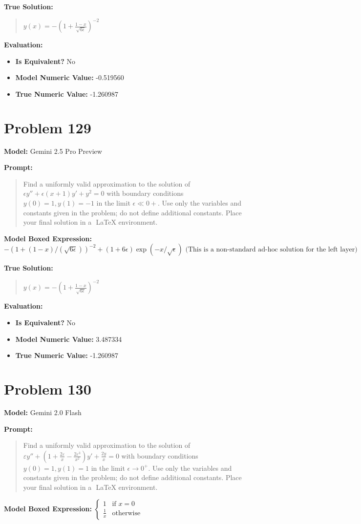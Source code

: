 \documentclass{article}
\begin{document}
{\textbf{True Solution:}
\begin{quote}
$y(x) = -\left(1 + \frac{1-x}{\sqrt{6\epsilon}}\right)^{-2}$
\end{quote}

\textbf{Evaluation:}
\begin{itemize}
\item \textbf{Is Equivalent?} No
\item \textbf{Model Numeric Value:} -0.519560
\item \textbf{True Numeric Value:} -1.260987
\end{itemize}
\vspace{1cm}
\section*{Problem 129}
\textbf{Model:} Gemini 2.5 Pro Preview

\textbf{Prompt:}
\begin{quote}
Find a uniformly valid approximation to the solution of $\epsilon y'' + \epsilon (x+1) y' + y^2 = 0$ with boundary conditions $y(0) = 1, y(1) = -1$ in the limit $\epsilon \ll 0+$. Use only the variables and constants given in the problem; do not define additional constants. Place your final solution in a $\boxed{}$ LaTeX environment.
\end{quote}
\textbf{Model Boxed Expression:} $-(1+(1-x)/(\sqrt{6\epsilon}))^{-2} + (1+6\epsilon)\exp(-x/\sqrt{\epsilon}) \text{ (This is a non-standard ad-hoc solution for the left layer)}$

\textbf{True Solution:}
\begin{quote}
$y(x) = -\left(1 + \frac{1-x}{\sqrt{6\epsilon}}\right)^{-2}$
\end{quote}

\textbf{Evaluation:}
\begin{itemize}
\item \textbf{Is Equivalent?} No
\item \textbf{Model Numeric Value:} 3.487334
\item \textbf{True Numeric Value:} -1.260987
\end{itemize}
\vspace{1cm}
\section*{Problem 130}
\textbf{Model:} Gemini 2.0 Flash

\textbf{Prompt:}
\begin{quote}
Find a uniformly valid approximation to the solution of $ \varepsilon y'' + \left(1 + \frac{2\varepsilon}{x} - \frac{2\varepsilon^3}{x^2}\right) y' + \frac{2y}{x} = 0 $ with boundary conditions $y(0)=1, y(1)=1$ in the limit $\epsilon \to 0^+$. Use only the variables and constants given in the problem; do not define additional constants. Place your final solution in a $\boxed{}$ LaTeX environment.
\end{quote}
\textbf{Model Boxed Expression:} $ \begin{cases} 1 & \text{if } x=0 \\ \frac{1}{x} & \text{otherwise} \end{cases} $

}
\end{document}
